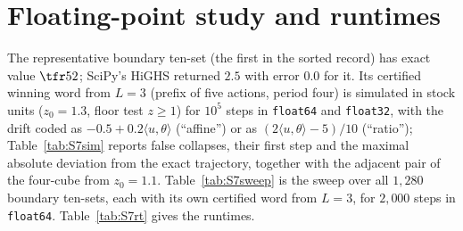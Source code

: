 \section{Floating-point study and runtimes}\label{S:float}

The representative boundary ten-set (the first in the sorted record) has exact value $\tfr52$; SciPy's HiGHS returned $2.5$ with error $0.0$ for it. Its certified winning word from $L=3$ (prefix of five actions, period four) is simulated in stock units ($z_0=1.3$, floor test $z\ge1$) for $10^5$ steps in \texttt{float64} and \texttt{float32}, with the drift coded as $-0.5+0.2\langle u,\theta\rangle$ (``affine'') or as $(2\langle u,\theta\rangle-5)/10$ (``ratio''); Table~\ref{tab:S7sim} reports false collapses, their first step and the maximal absolute deviation from the exact trajectory, together with the adjacent pair of the four-cube from $z_0=1.1$. Table~\ref{tab:S7sweep} is the sweep over all $1{,}280$ boundary ten-sets, each with its own certified word from $L=3$, for $2{,}000$ steps in \texttt{float64}. Table~\ref{tab:S7rt} gives the runtimes.
\begin{table}[H]\centering\small
\caption{Floating-point simulation of certified winning words.}\label{tab:S7sim}

\end{table}
\begin{table}[H]\centering\small
\caption{Sweep over the $1{,}280$ boundary ten-sets ($2{,}000$ steps, \texttt{float64}).}\label{tab:S7sweep}

\end{table}
\begin{table}[H]\centering\small
\caption{Runtimes (seconds, single core) of the full run of \texttt{run\_all.py} and two sub-stages.}\label{tab:S7rt}
\qquad
\end{table}
